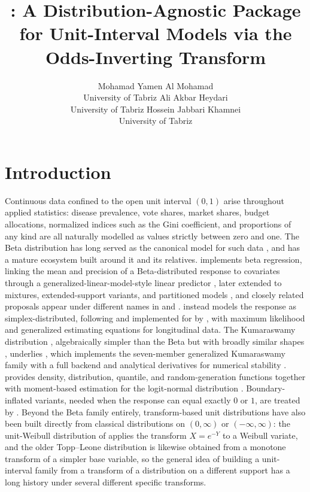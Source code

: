 \documentclass[article]{jss}
\author{Mohamad Yamen Al Mohamad\\University of Tabriz \AND
        Ali Akbar Heydari\\University of Tabriz \AND
        Hossein Jabbari Khamnei\\University of Tabriz}
\title{\pkg{unitTransformDist}: A Distribution-Agnostic \proglang{R} Package for Unit-Interval Models via the Odds-Inverting Transform}
\begin{document}
\section{Introduction}
\label{sec:intro}

Continuous data confined to the open unit interval $(0,1)$ arise throughout applied statistics: disease prevalence, vote shares, market shares, budget allocations, normalized indices such as the Gini coefficient, and proportions of any kind are all naturally modelled as values strictly between zero and one. The Beta distribution has long served as the canonical model for such data \citep{johnsonkotzbalakrishnan1994}, and  has a mature ecosystem built around it and its relatives.  implements beta regression, linking the mean and precision of a Beta-distributed response to covariates through a generalized-linear-model-style linear predictor \citep{ferrari2004beta,cribarineto2010betareg}, later extended to mixtures, extended-support variants, and partitioned models \citep{gruen2012betareg}, and closely related proposals appear under different names in \citet{kieschnick2003} and \citet{smithsonverkuilen2006}.  instead models the response as simplex-distributed, following \citet{songtan2000} and implemented for  by \citet{zhang2016simplexreg}, with maximum likelihood and generalized estimating equations for longitudinal data. The Kumaraswamy distribution \citep{kumaraswamy1980}, algebraically simpler than the Beta but with broadly similar shapes \citep{jones2009kumaraswamy}, underlies , which implements the seven-member generalized Kumaraswamy family \citep{carrasco2010generalized} with a full  backend and analytical derivatives for numerical stability \citep{lopes2025gkwdist}.  provides density, distribution, quantile, and random-generation functions together with moment-based estimation for the logit-normal distribution \citep{wutzler2024logitnorm}. Boundary-inflated variants, needed when the response can equal exactly $0$ or $1$, are treated by \citet{ospinaferrari2010}. Beyond the Beta family entirely, transform-based unit distributions have also been built directly from classical distributions on $(0,\infty)$ or $(-\infty,\infty)$: the unit-Weibull distribution of \citet{mazucheli2018unitweibull} applies the transform $X = e^{-Y}$ to a Weibull variate, and the older Topp--Leone distribution \citep{toppleone1955} is likewise obtained from a monotone transform of a simpler base variable, so the general idea of building a unit-interval family from a transform of a distribution on a different support has a long history under several different specific transforms.
\end{document}
